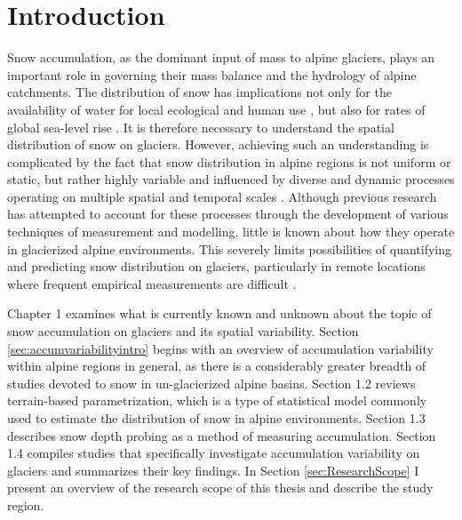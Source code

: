 \documentclass{sfuthesis}
\begin{document}
\tableofcontents\clearpage
{}\listoftables\clearpage
{}\listoffigures






\mainmatter%

\chapter{Introduction}

Snow accumulation, as the dominant input of mass to alpine glaciers, plays an important role in governing their mass balance and the hydrology of alpine catchments. The distribution of snow has implications not only for the availability of water for local ecological and human use \citep{Barnett2005,ONeel2014}, but also for rates of global sea-level rise \citep{Gardner2013}. It is therefore necessary to understand the spatial distribution of snow on glaciers. However, achieving such an understanding is complicated by the fact that snow distribution in alpine regions is not uniform or static, but rather highly variable and influenced by diverse and dynamic processes operating on multiple spatial and temporal scales \citep[e.g.][]{Clark2011}. Although previous research has attempted to account for these processes through the development of various techniques of measurement and modelling, little is known about how they operate in glacierized alpine environments. This severely limits possibilities of quantifying and predicting snow distribution on glaciers, particularly in remote locations where frequent empirical measurements are difficult \citep[e.g.][]{Nolan2015}.

Chapter 1 examines what is currently known and unknown about the topic of snow accumulation on glaciers and its spatial variability. Section \ref{sec:accumvariabilityintro} begins with an overview of accumulation variability within alpine regions in general, as there is a considerably greater breadth of studies devoted to snow in un-glacierized alpine basins. Section 1.2 reviews terrain-based parametrization, which is a type of statistical model commonly used to estimate the distribution of snow in alpine environments. Section 1.3 describes snow depth probing as a method of measuring accumulation. Section 1.4 compiles studies that specifically investigate accumulation variability on glaciers and summarizes their key findings. In Section \ref{sec:ResearchScope} I present an overview of the research scope of this thesis and describe the study region.
\end{document}
